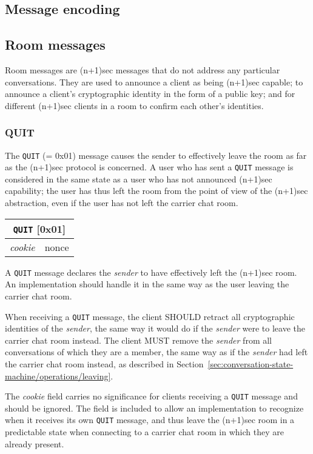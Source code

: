 \documentclass{article}
\def\message#1{\texttt{#1}}
\def\field#1{\textit{#1}}
\def\type#1{\textsf{#1}}
\newenvironment{basicmessage}[2]{
\newcommand{\messagefield}[2]{
\field{##1} & \type{##2} \\
\hline
}
\hspace{2em minus 2em}\begin{tabular}{|l|l|}
\hline
\multicolumn{2}{|c|}{\message{#1} [#2]} \\
\hline
\hline
}{
\end{tabular}
}
\begin{document}
\subsection{Message encoding}
\label{sec:messages/message-encoding}


\subsection{Room messages}
\label{sec:messages/room-messages}

Room messages are (n+1)sec messages that do not address any particular conversations.
They are used to announce a client as being (n+1)sec capable; to announce a client's cryptographic identity in the form of a public key; and for different (n+1)sec clients in a room to confirm each other's identities.


\subsubsection{QUIT}
\label{sec:messages/quit}

The \message{QUIT} (= 0x01) message causes the sender to effectively leave the room as far as the (n+1)sec protocol is concerned.
A user who has sent a \message{QUIT} message is considered in the same state as a user who has not announced (n+1)sec capability; the user has thus left the room from the point of view of the (n+1)sec abstraction, even if the user has not left the carrier chat room.

\begin{basicmessage}{QUIT}{0x01}
\messagefield{cookie}{nonce}
\end{basicmessage}

A \message{QUIT} message declares the \field{sender} to have effectively left the (n+1)sec room.
An implementation should handle it in the same way as the user leaving the carrier chat room.

When receiving a \message{QUIT} message, the client SHOULD retract all cryptographic identities of the \field{sender}, the same way it would do if the \field{sender} were to leave the carrier chat room instead.
The client MUST remove the \field{sender} from all conversations of which they are a member, the same way as if the \field{sender} had left the carrier chat room instead, as described in Section~\ref{sec:conversation-state-machine/operations/leaving}.

The \field{cookie} field carries no significance for clients receiving a \message{QUIT} message and should be ignored.
The field is included to allow an implementation to recognize when it receives its own \message{QUIT} message, and thus leave the (n+1)sec room in a predictable state when connecting to a carrier chat room in which they are already present.
\end{document}
